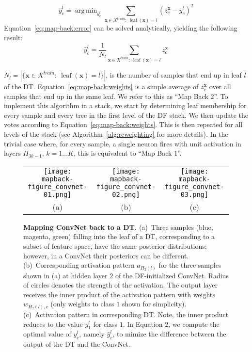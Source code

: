 \documentclass[twocolumn]{svjour3}
\DeclareMathOperator{\leaf}{leaf}
\DeclareMathOperator*{\argmin}{arg\,min}
\begin{document}
\begin{equation}
\hat{y}^l_c = \argmin_{y^l_c} \sum\limits_{\mathbf{x} \in X^{train}: \ \leaf(\mathbf{x})=l} \left( z^{\mathbf{x}}_c - y^l_c \right)^2
\label{eq:map-back:error}
\end{equation}
Equation~\ref{eq:map-back:error} can be solved analytically, yielding the following result:
\begin{equation}
\hat{y}^l_c = \frac{1}{N_l} \sum\limits_{\mathbf{x} \in X^{train} : \ \leaf(\mathbf{x})=l} z^{\mathbf{x}}_c 
\label{eq:map-back:weights}
\end{equation}

$N_l = |\{{\mathbf{x} \in X^{train}: \ \leaf(\mathbf{x})=l}\}|$, is the number of samples that end up in leaf $l$ of the DT.
Equation~\ref{eq:map-back:weights} is a simple average of $z^{\mathbf{x}}_c$ over all samples that end up in the same leaf.
We refer to this as ``Map Back 2''.
To implement this algorithm in a stack, we start by determining leaf membership for every sample and every tree in the first level of the DF stack. We then update the votes according to Equation~\ref{eq:map-back:weights}.  This is then repeated for all levels of the stack
(see Algorithm~\ref{alg:reweighting} for more details).
In the trivial case where, for every sample, a single neuron fires with unit activation in layers $H_{3k-1}$, $k=1...K$, this is equivalent to ``Map Back 1''.

\begin{figure*}
\begin{center}
\begin{tabular}{ccc}

   \texttt{[image: mapback-figure\_convnet-01.png]} &
   \texttt{[image: mapback-figure\_convnet-02.png]} &
   \texttt{[image: mapback-figure\_convnet-03.png]} \\
				   (a) & (b) & (c) \\
\end{tabular}
\end{center}
   \caption{\textbf{Mapping ConvNet back to a DT. } (a)~Three samples (blue, magenta, green) falling into the leaf of a DT, corresponding to a subset of feature space, have the same posterior distributions; however, in a ConvNet their posteriors can be different. (b)~Corresponding activation pattern $a_{H_2(l)}$ for the three samples shown in (a) at hidden layer $2$ of the DF-initialized ConvNet. Radius of circles denotes the strength of the activation. The output layer receives the inner product of the activation pattern with weights $w_{H_2(l),c}$ (only weights to class $1$ shown for simplicity). (c)~Activation pattern in corresponding DT. Note, the inner product reduces to the value $y^l_1$ for class $1$. In Equation 2, we compute the optimal value of $y^l_c$, namely $\hat{y}^l_c$, to mimize the difference between the output of the DT and the ConvNet.}
\label{fig:map-back}
\end{figure*}
\end{document}
